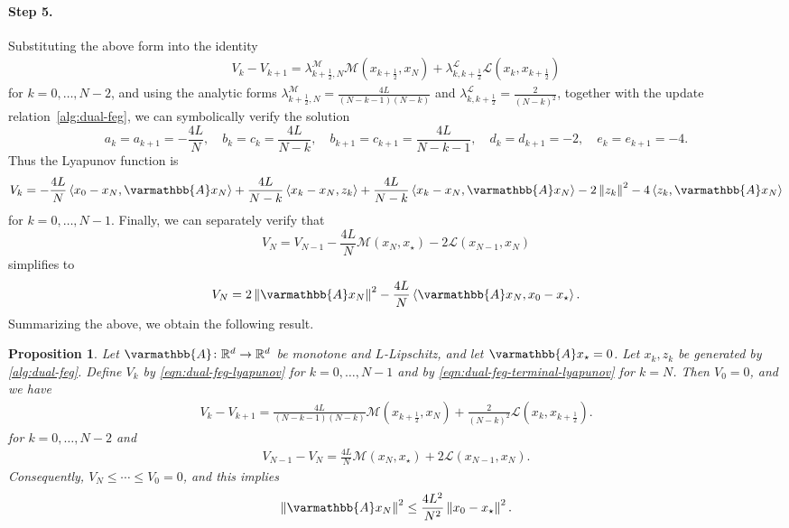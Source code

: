 \documentclass{article}
\theoremstyle{definition}
\theoremstyle{plain}
\newtheorem{proposition}{Proposition}
\newcommand{\cL}{{\mathcal{L}}}
\newcommand{\cM}{{\mathcal{M}}}
\newcommand{\reals}{\mathbb{R}}
\newcommand{\opA}{{\varmathbb{A}}}
\newcommand{\inprod}[2]{\left\langle #1,#2 \right\rangle}
\newcommand{\sqnorm}[1]{\left\| #1 \right\|^2}
\begin{document}
\paragraph{Step 5.}
Substituting the above form into the identity
\begin{align*}
    V_k-V_{k+1}
    =
    \lambda^\cM_{k+\frac12,N}\cM(x_{k+\frac12},x_N)
    +\lambda^\cL_{k,k+\frac12}\cL(x_k,x_{k+\frac12})
\end{align*}
for $k=0,\dots,N-2$, and using the analytic forms $\lambda^\cM_{k+\frac12,N} = \frac{4L}{(N-k-1)(N-k)}$ and $\lambda^\cL_{k,k+\frac12} = \frac{2}{(N-k)^2}$, together with the update relation~\eqref{alg:dual-feg}, we can symbolically verify the solution
\[
    a_k=a_{k+1}=-\frac{4L}{N}, 
    \quad
    b_k=c_k=\frac{4L}{N-k}, 
    \quad
    b_{k+1}=c_{k+1}=\frac{4L}{N-k-1},
    \quad
    d_k=d_{k+1}=-2,
    \quad
    e_k=e_{k+1}=-4.
\]
Thus the Lyapunov function is
\begin{align}
\label{eqn:dual-feg-lyapunov}
    V_k
    =
    -\frac{4L}{N}\inprod{x_0-x_N}{\opA x_N}
    +\frac{4L}{N-k}\inprod{x_k-x_N}{z_k}
    +\frac{4L}{N-k}\inprod{x_k-x_N}{\opA x_N}
    -2\sqnorm{z_k}
    -4\inprod{z_k}{\opA x_N}
\end{align}
for $k=0,\dots,N-1$.
Finally, we can separately verify that
\[
    V_N = V_{N-1} - \frac{4L}{N}\cM(x_N,x_\star) - 2\cL(x_{N-1},x_N)
\]
simplifies to 
\begin{align}
\label{eqn:dual-feg-terminal-lyapunov}
    V_N
    =
    2\sqnorm{\opA x_N}
    -\frac{4L}{N}\inprod{\opA x_N}{x_0-x_\star}.
\end{align}
Summarizing the above, we obtain the following result.

\begin{proposition}
\label{proposition:dual-feg}
Let $\opA\colon\reals^d\to\reals^d$ be monotone and $L$-Lipschitz, and let $\opA x_\star=0$.
Let $x_k,z_k$ be generated by \eqref{alg:dual-feg}.
Define $V_k$ by \eqref{eqn:dual-feg-lyapunov} for $k=0,\dots,N-1$ and by \eqref{eqn:dual-feg-terminal-lyapunov} for $k=N$.
Then $V_0=0$, and we have 
\begin{align}
\label{eqn:dual-feg-step-identity}
    V_k-V_{k+1}
    =
    \frac{4L}{(N-k-1)(N-k)}\cM(x_{k+\frac12},x_N)
    +\frac{2}{(N-k)^2}\cL(x_k,x_{k+\frac12}).
\end{align}
for $k=0,\dots,N-2$ and 
\begin{align}
\label{eqn:dual-feg-terminal-identity}
    V_{N-1}-V_N
    =
    \frac{4L}{N}\cM(x_N,x_\star)
    +2\cL(x_{N-1},x_N).
\end{align}
Consequently, $V_N\le\cdots\le V_0=0$, and this implies
\[
    \sqnorm{\opA x_N}\le\frac{4L^2}{N^2}\sqnorm{x_0-x_\star}.
\]
\end{proposition}
\end{document}

